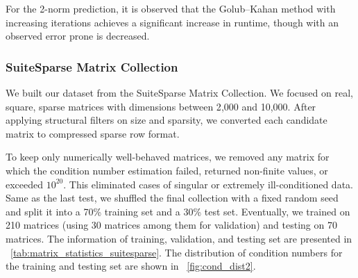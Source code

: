 \documentclass[11pt,a4paper]{article}
\theoremstyle{plain}
\theoremstyle{definition}
\theoremstyle{remark}
\begin{document}
For the 2-norm prediction, it is observed that the Golub–Kahan method with increasing iterations achieves a significant increase in runtime, though with an observed error prone is decreased. 





\subsubsection{SuiteSparse Matrix Collection}

We built our dataset from the SuiteSparse Matrix Collection. We focused on real, square, sparse matrices with dimensions between 2{,}000 and 10{,}000. After applying structural filters on size and sparsity, we converted each candidate matrix to compressed sparse row format. 

\begin{table}[htbp]
\centering
\caption{Statistics of the matrix datasets. Condition numbers are reported with respect to the 1-norm ($\kappa_1$) and 2-norm ($\kappa_2$). Sparsity is independent of the norm.}
\label{tab:matrix_statistics_suitesparse}
\end{table}

To keep only numerically well-behaved matrices, we removed any matrix for which the condition number estimation failed, returned non-finite values, or exceeded $10^{20}$. This eliminated cases of singular or extremely ill-conditioned data. Same as the last test,  we shuffled the final collection with a fixed random seed and split it into a 70\% training set and a 30\% test set. Eventually, we trained on 210 matrices (using 30 matrices among them for validation) and testing on 70 matrices. The information of training, validation, and testing set are presented in \tablename~\ref{tab:matrix_statistics_suitesparse}.  The distribution of condition numbers for the training and testing set are shown in \figurename~\ref{fig:cond_dist2}. 
\end{document}
